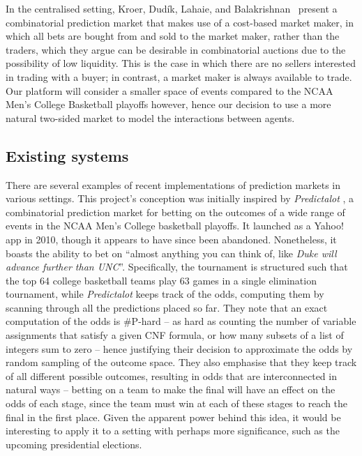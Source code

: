 \documentclass[10pt,a4paper]{article}
\theoremstyle{plain}
\theoremstyle{definition}
\begin{document}
	In the centralised setting, Kroer, Dud\'ik, Lahaie, and
	Balakrishnan~\cite{Kroer2016} present a combinatorial prediction market
	that makes use of a cost-based market maker, in which all bets are bought
	from and sold to the market maker, rather than the traders, which they
	argue can be desirable in combinatorial auctions due to the possibility of
	low liquidity. This is the case in which there are no sellers interested in
	trading with a buyer; in contrast, a market maker is always available to
	trade. Our platform will consider a smaller space of events compared to the
	NCAA Men's College Basketball playoffs however, hence our decision to use a
	more natural two-sided market to model the interactions between agents.

	\subsection{Existing systems}

	There are several examples of recent implementations of prediction markets
	in various settings. This project's conception was initially inspired by
	\emph{Predictalot} \cite{Predictalot}, a combinatorial prediction market
	for betting on the outcomes of a wide range of events in the NCAA Men's
	College basketball playoffs. It launched as a Yahoo! app in 2010, though it
	appears to have since been abandoned. Nonetheless, it boasts the ability
	to bet on ``almost anything you can think of, like \emph{Duke will advance
	further than UNC}''. Specifically, the tournament is structured such that
	the top 64 college basketball teams play 63 games in a single elimination
	tournament, while \emph{Predictalot} keeps track of the odds, computing
	them by scanning through all the predictions placed so far. They note that
	an exact computation of the odds is \#P-hard -- as hard as counting the
	number of variable assignments that satisfy a given CNF formula, or how
	many subsets of a list of integers sum to zero -- hence justifying their
	decision to approximate the odds by random sampling of the outcome space.
	They also emphasise that they keep track of all different possible
	outcomes, resulting in odds that are interconnected in natural ways --
	betting on a team to make the final will have an effect on the odds of each
	stage, since the team must win at each of these stages to reach the final
	in the first place. Given the apparent power behind this idea, it would be
	interesting to apply it to a setting with perhaps more significance, such
	as the upcoming presidential elections.
\end{document}
